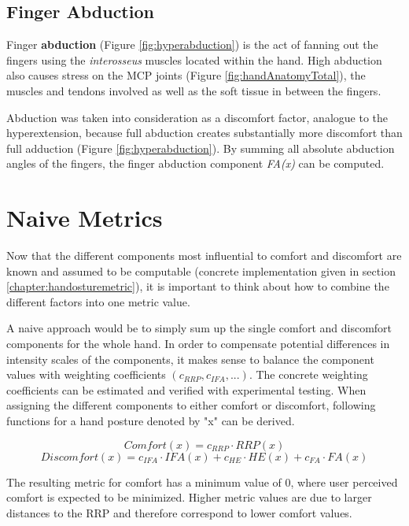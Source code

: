 \subsection{Finger Abduction}

Finger \textbf{abduction} (Figure \ref{fig:hyperabduction}) is the act of fanning out the fingers using the \textit{interosseus} muscles located within the hand. 
High abduction also causes stress on the MCP joints (Figure \ref{fig:handAnatomyTotal}), the muscles and tendons involved as well as the soft tissue in between the fingers.

Abduction was taken into consideration as a discomfort factor, analogue to the hyperextension, because full abduction creates substantially more discomfort than full adduction (Figure \ref{fig:hyperabduction}). By summing all absolute abduction angles of the fingers, the finger abduction component \textit{FA(x)} can be computed.

\section{Naive Metrics}

Now that the different components most influential to comfort and discomfort are known and assumed to be computable (concrete implementation given in section \ref{chapter:handosturemetric}), it is important to think about how to combine the different factors into one metric value. 

A naive approach would be to simply sum up the single comfort and discomfort components for the whole hand. In order to compensate potential differences in intensity scales of the components, it makes sense to balance the component values with weighting coefficients \begin{math}(c_{RRP}, c_{IFA}, ...)\end{math}. The concrete weighting coefficients can be estimated and verified with experimental testing. When assigning the different components to either comfort or discomfort, following functions for a hand posture denoted by "x" can be derived.

	\[
	Comfort(x) = c_{RRP}\cdot RRP(x)
	\]
	\[
	Discomfort(x) = c_{IFA}\cdot IFA(x)  +  c_{HE}\cdot HE(x)  +  c_{FA}\cdot FA(x)
	\]
	\vspace{5pt}
	
	
The resulting metric for comfort has a minimum value of 0, where user perceived comfort is expected to be minimized. Higher metric values are due to larger distances to the RRP and therefore correspond to lower comfort values.

